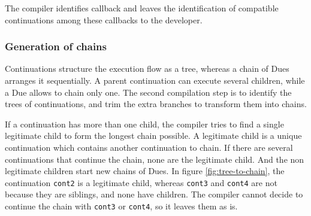 The compiler identifies callback and leaves the identification of compatible continuations among these callbacks to the developer.




\subsubsection{Generation of chains}

Continuations structure the execution flow as a tree, whereas a chain of Dues arranges it sequentially.
A parent continuation can execute several children, while a Due allows to chain only one.
The second compilation step is to identify the trees of continuations, and trim the extra branches to transform them into chains.

If a continuation has more than one child, the compiler tries to find a single legitimate child to form the longest chain possible.
A legitimate child is a unique continuation which contains another continuation to chain.
If there are several continuations that continue the chain, none are the legitimate child.
And the non legitimate children start new chains of Dues.
In figure \ref{fig:tree-to-chain}, the continuation \texttt{cont2} is a legitimate child, whereas \texttt{cont3} and \texttt{cont4} are not because they are siblings, and none have children.
The compiler cannot decide to continue the chain with \texttt{cont3} or \texttt{cont4}, so it leaves them as is.

